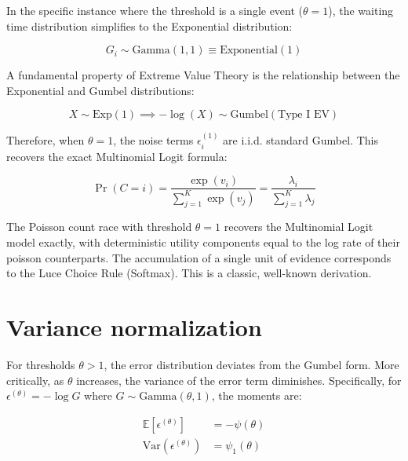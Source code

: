 \documentclass[
  man,
  floatsintext,
  longtable,
  a4paper,
  nolmodern,
  notxfonts,
  notimes,
  colorlinks=true,linkcolor=blue,citecolor=blue,urlcolor=blue]{apa7}
\begin{document}
In the specific instance where the threshold is a single event
(\(\theta = 1\)), the waiting time distribution simplifies to the
Exponential distribution:

\[
G_i \sim \text{Gamma}(1, 1) \equiv \text{Exponential}(1)
\]

A fundamental property of Extreme Value Theory is the relationship
between the Exponential and Gumbel distributions:

\[
X \sim \text{Exp}(1) \implies -\log(X) \sim \text{Gumbel}(\text{Type I EV})
\]

Therefore, when \(\theta=1\), the noise terms \(\epsilon_i^{(1)}\) are
i.i.d. standard Gumbel. This recovers the exact Multinomial Logit
formula:

\[
\Pr(C=i) = \frac{\exp(v_i)}{\sum_{j=1}^K \exp(v_j)} = \frac{\lambda_i}{\sum_{j=1}^K \lambda_j}
\]

\begin{tcolorbox}[enhanced jigsaw, arc=.35mm, bottomrule=.15mm, bottomtitle=1mm, breakable, colback=white, colbacktitle=quarto-callout-note-color!10!white, colframe=quarto-callout-note-color-frame, coltitle=black, left=2mm, leftrule=.75mm, opacityback=0, opacitybacktitle=0.6, rightrule=.15mm, title={Result 2 (Logit Boundary)}, titlerule=0mm, toprule=.15mm, toptitle=1mm]

The Poisson count race with threshold \(\theta=1\) recovers the
Multinomial Logit model exactly, with deterministic utility components
equal to the log rate of their poisson counterparts. The accumulation of
a single unit of evidence corresponds to the Luce Choice Rule (Softmax).
This is a classic, well-known derivation.

\end{tcolorbox}

\section{Variance normalization}\label{sec-variance-normalization}

For thresholds \(\theta > 1\), the error distribution deviates from the
Gumbel form. More critically, as \(\theta\) increases, the variance of
the error term diminishes. Specifically, for
\(\epsilon^{(\theta)} = -\log G\) where
\(G \sim \text{Gamma}(\theta, 1)\), the moments are:

\[
\begin{aligned} \mathbb{E}[\epsilon^{(\theta)}] &= -\psi(\theta) \\ \text{Var}(\epsilon^{(\theta)}) &= \psi_1(\theta) \end{aligned}
\]
\end{document}
